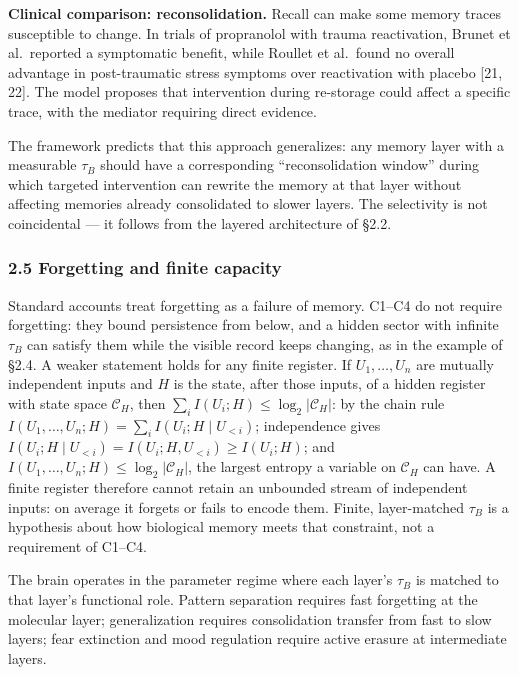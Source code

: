 \documentclass[
]{article}
\begin{document}
\textbf{Clinical comparison: reconsolidation.} Recall can make some
memory traces susceptible to change. In trials of propranolol with
trauma reactivation, Brunet et al.~reported a symptomatic benefit, while
Roullet et al.~found no overall advantage in post-traumatic stress
symptoms over reactivation with placebo {[}21, 22{]}. The model proposes
that intervention during re-storage could affect a specific trace, with
the mediator requiring direct evidence.

The framework predicts that this approach generalizes: any memory layer
with a measurable \(\tau_B\) should have a corresponding
``reconsolidation window'' during which targeted intervention can
rewrite the memory at that layer without affecting memories already
consolidated to slower layers. The selectivity is not coincidental ---
it follows from the layered architecture of §2.2.

\hypertarget{forgetting-and-finite-capacity}{%
\subsubsection{2.5 Forgetting and finite
capacity}\label{forgetting-and-finite-capacity}}

Standard accounts treat forgetting as a failure of memory. C1--C4 do not
require forgetting: they bound persistence from below, and a hidden
sector with infinite \(\tau_B\) can satisfy them while the visible
record keeps changing, as in the example of §2.4. A weaker statement
holds for any finite register. If \(U_1, \ldots, U_n\) are mutually
independent inputs and \(H\) is the state, after those inputs, of a
hidden register with state space \(\mathcal{C}_H\), then
\(\sum_i I(U_i; H) \leq \log_2|\mathcal{C}_H|\): by the chain rule
\(I(U_1, \ldots, U_n; H) = \sum_i I(U_i; H \mid U_{<i})\); independence
gives \(I(U_i; H \mid U_{<i}) = I(U_i; H, U_{<i}) \geq I(U_i; H)\); and
\(I(U_1, \ldots, U_n; H) \leq \log_2|\mathcal{C}_H|\), the largest
entropy a variable on \(\mathcal{C}_H\) can have. A finite register
therefore cannot retain an unbounded stream of independent inputs: on
average it forgets or fails to encode them. Finite, layer-matched
\(\tau_B\) is a hypothesis about how biological memory meets that
constraint, not a requirement of C1--C4.

The brain operates in the parameter regime where each layer's \(\tau_B\)
is matched to that layer's functional role. Pattern separation requires
fast forgetting at the molecular layer; generalization requires
consolidation transfer from fast to slow layers; fear extinction and
mood regulation require active erasure at intermediate layers.
\end{document}
